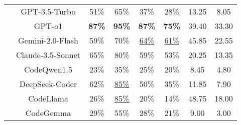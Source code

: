 \begin{table}[t]
{\begin{tabular}{cccccccc}
 & GPT-3.5-Turbo & 51\% & 65\% & 37\% & 28\% & 13.25 & 8.05 \\
 & GPT-o1 & \textbf{87\%} & \textbf{95\%} & \textbf{87\%} & \textbf{75\%} & 39.40 & 33.30\\
 & Gemini-2.0-Flash & 59\% & 70\% & \underline{64\%} & \underline{61\%} & 45.85 & 22.55 \\
 & Claude-3.5-Sonnet & 65\% & 80\% & 59\% & 53\% & 20.25 & 13.35 \\
 & CodeQwen1.5 & 23\% & 35\% & 25\% & 20\% & 8.45 & 4.80 \\
 & DeepSeek-Coder & 62\% & \underline{85\%} & 50\% & 35\% & 11.85 & 7.90 \\
 & CodeLlama & 26\% & \underline{85\%} & 20\% & 14\% & 48.75 & 18.00 \\
 & CodeGemma & 29\% & 55\% & 28\% & 21\% & 9.00 & 3.00 \\
\hline
\end{tabular}
}
\label{tab: main_results}
\vspace{-10pt}
\end{table}

